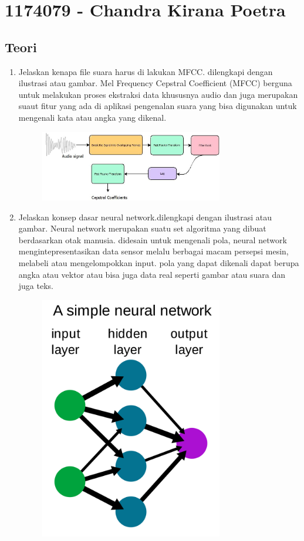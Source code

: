 \section{1174079 - Chandra Kirana Poetra}

\subsection{Teori}
\begin{enumerate}
	\item Jelaskan kenapa file suara harus di lakukan MFCC. dilengkapi dengan ilustrasi atau gambar.
	\hfill\break
	Mel Frequency Cepstral Coefficient (MFCC) berguna untuk melakukan proses ekstraksi data khususnya audio dan juga merupakan suaut fitur yang ada di aplikasi pengenalan suara yang bisa digunakan untuk mengenali kata atau angka yang dikenal.
	\hfill\break
	\begin{figure}[H]
		\includegraphics[width=8cm]{figures/1174079/6/mfcc.jpeg}
		\centering
	\end{figure}
	\item Jelaskan konsep dasar neural network.dilengkapi dengan ilustrasi atau gambar.
	\hfill\break
	Neural network merupakan suatu set algoritma yang dibuat berdasarkan otak manusia. didesain untuk mengenali pola, neural network mengintepresentasikan data sensor melalu berbagai macam persepsi mesin, melabeli atau mengelompokkan input. pola yang dapat dikenali dapat berupa angka atau vektor atau bisa juga data real seperti gambar atau suara dan juga teks.
	\hfill\break
	\begin{figure}[H]
		\includegraphics[width=8cm]{figures/1174079/6/neural.png}

\end{figure}
\end{enumerate}
